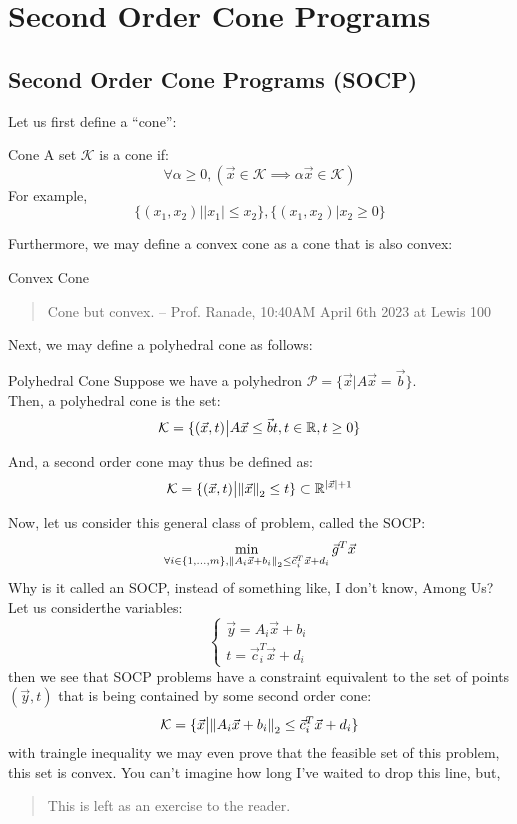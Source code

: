 \chapter{Second Order Cone Programs}

\section{Second Order Cone Programs (SOCP)}
Let us first define a ``cone'':
\begin{ln-define}{Cone}{}
    A set $\mathcal{K}$ is a cone if:
    \[
        \forall \alpha \geq 0, (\vec{x} \in \mathcal{K} \implies \alpha \vec{x} \in \mathcal{K})
    \]
    For example,
    \[
        \{ (x_1, x_2) \big| |x_1| \leq x_2 \}, \{ (x_1, x_2) \big| x_2 \geq 0 \}
    \]
\end{ln-define}
Furthermore, we may define a convex cone as a cone that is also convex:
\begin{ln-define}{Convex Cone}{}
    \begin{quote}
        Cone but convex. -- Prof. Ranade, 10:40AM April 6th 2023 at Lewis 100
    \end{quote}
\end{ln-define}
Next, we may define a polyhedral cone as follows:
\begin{ln-define}{Polyhedral Cone}{}
    Suppose we have a polyhedron $\mathcal{P} = \{ \vec{x} \big| A \vec{x} = \vec{b}\}$. \\
    Then, a polyhedral cone is the set:
    \[
        \mathcal{K} = \{
            (\vec{x}, t) \big| A \vec{x} \leq \vec{b} t, t \in \mathbb{R}, t \geq 0
        \}
    \]
\end{ln-define}
And, a second order cone may thus be defined as:
\[
    \mathcal{K} = \{(\vec{x}, t) \big| {\| \vec{x} \|}_{2}^{} \leq t \} \subset \mathbb{R}^{|\vec{x}| + 1}
\]

Now, let us consider this general class of problem, called the SOCP:
\[
    \min_{
        \forall i \in \{1, \dots, m\}, {\| A_i \vec{x} + b_i \|}_{2}^{} \leq \vec{c}_i^T \vec{x} + d_i
    } \vec{g}^T \vec{x}
\]
Why is it called an SOCP, instead of something like, I don't know, Among Us? \\
Let us considerthe variables:
\[
    \begin{cases}
        \vec{y} = A_i \vec{x} + b_i \\
        t = \vec{c}_i^T \vec{x} + d_i
    \end{cases}
\]
then we see that SOCP problems have a constraint equivalent to the set of points $(\vec{y}, t)$ that is being contained by some second order cone:
\[
    \mathcal{K} = \{\vec{x} \big| {\| A_i \vec{x} + b_i \|}_{2}^{} \leq \vec{c}_i^T \vec{x} + d_i \}
\]
with traingle inequality we may even prove that the feasible set of this problem, this set is convex.
You can't imagine how long I've waited to drop this line, but,
\begin{quote}
    This is left as an exercise to the reader.
\end{quote}

